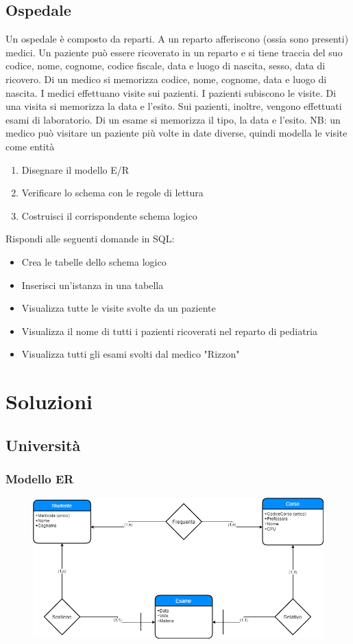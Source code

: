 \documentclass{article}
\begin{document}
	\subsection{Ospedale}
	Un ospedale è composto da reparti. A un reparto afferiscono (ossia sono presenti) medici. Un paziente può essere ricoverato in un reparto e si tiene traccia del suo codice, nome, cognome, codice fiscale, data e luogo di nascita, sesso, data di ricovero. Di un medico si memorizza codice, nome, cognome, data e luogo di nascita. I medici effettuano visite sui pazienti. I pazienti subiscono le visite. Di una visita si memorizza la data e l’esito. Sui pazienti, inoltre, vengono effettuati esami di laboratorio. Di un esame si memorizza il tipo, la data e l’esito. NB: un medico può visitare un paziente più volte in date diverse, quindi modella le visite come entità
	\begin{enumerate}
		\item Disegnare il modello E/R
		\item Verificare lo schema con le regole di lettura
		\item Costruisci il corrispondente schema logico
	\end{enumerate}
	Rispondi alle seguenti domande in SQL:
	\begin{itemize}
		\item Crea le tabelle dello schema logico
		\item Inserisci un'istanza in una tabella
		\item Visualizza tutte le visite svolte da un paziente
		\item Visualizza il nome di tutti i pazienti ricoverati nel reparto di pediatria
		\item Visualizza tutti gli esami svolti dal medico "Rizzon"
	\end{itemize}
	\pagebreak
	
	\section{Soluzioni}
	\subsection{Università}
	\subsubsection{Modello ER}
	\begin{figure}[h!]
		\centering
		\includegraphics[scale=0.5]{images/Universita.png}
	\end{figure}
\end{document}

